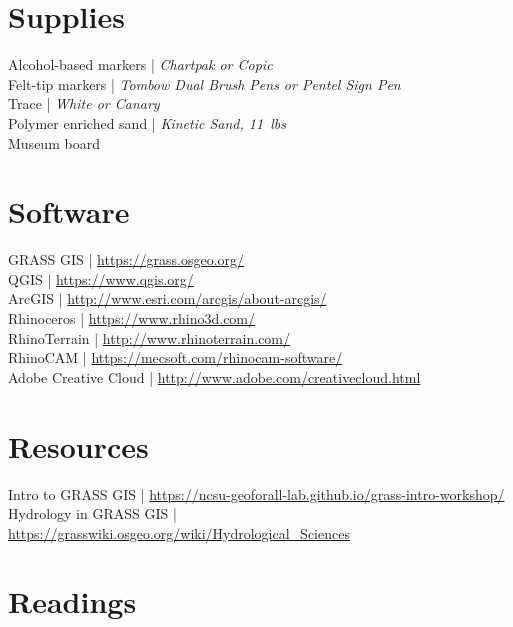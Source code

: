 \documentclass[11pt,article,oneside]{memoir}
\begin{document}
\section{Supplies}
Alcohol-based markers | \emph{Chartpak or Copic}\\
Felt-tip markers | \emph{Tombow Dual Brush Pens or Pentel Sign Pen}\\
Trace | \emph{White or Canary}\\
Polymer enriched sand | \emph{Kinetic Sand, 11~lbs}\\
Museum board \\

\section{Software}
GRASS GIS | \url{https://grass.osgeo.org/}\\
QGIS | \url{https://www.qgis.org/}\\
ArcGIS | \url{http://www.esri.com/arcgis/about-arcgis/}\\
Rhinoceros | \url{https://www.rhino3d.com/}\\
RhinoTerrain | \url{http://www.rhinoterrain.com/}\\
RhinoCAM | \url{https://mecsoft.com/rhinocam-software/}\\
Adobe Creative Cloud | \url{http://www.adobe.com/creativecloud.html}\\

\section{Resources}
Intro to GRASS GIS | \url{https://ncsu-geoforall-lab.github.io/grass-intro-workshop/}\\
Hydrology in GRASS GIS | \url{https://grasswiki.osgeo.org/wiki/Hydrological_Sciences}\\

\clearpage
\section{Readings}
\renewcommand*{\bibfont}{\normalsize} %
\vspace*{0.5cm}
\nocite{*}
\setlength{}
\printbibliography[heading=none]
\end{document}
